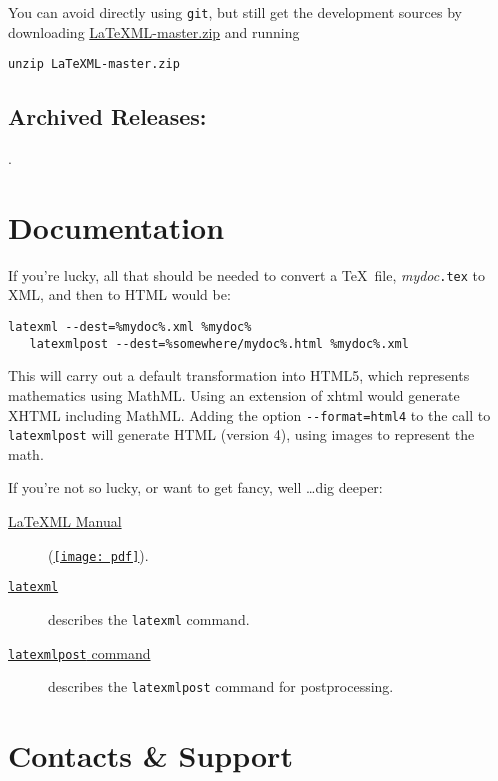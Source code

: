 \documentclass{article}
\newcommand{\PDFIcon}{\texttt{[image: pdf]}}
\begin{document}
You can avoid directly using \texttt{git}, but still get the development sources
by downloading
\href{https://github.com/brucemiller/LaTeXML/archive/master.zip}{LaTeXML-master.zip}
and running
\begin{lstlisting}[style=shell]
unzip LaTeXML-master.zip
\end{lstlisting}

\subsection{Archived Releases:}\label{archive}
\AllReleases.

\section{Documentation}\label{docs}
If you're lucky, all that should be needed to convert
a \TeX\ file, \textit{mydoc}\texttt{.tex} to XML, and
then to HTML would be:
\begin{lstlisting}[style=shell]
   latexml --dest=%mydoc%.xml %mydoc%
   latexmlpost --dest=%somewhere/mydoc%.html %mydoc%.xml
\end{lstlisting}
This will carry out a default transformation into HTML5,
which represents mathematics using MathML.  Using an
extension of xhtml would generate XHTML including MathML.
Adding the option \verb|--format=html4| to the call to \verb|latexmlpost|
will generate HTML (version 4), using images to represent the math.

If you're not so lucky, or want to get fancy, well \ldots dig deeper:
\begin{description}
\item[\href{manual/}{LaTeXML Manual}] (\href{manual.pdf}{\PDFIcon}).
\item[\href{manual/commands/latexml.html}{\texttt{latexml}}]
    describes the \texttt{latexml} command.
\item[\href{manual/commands/latexmlpost.html}{\texttt{latexmlpost} command}]
   describes the \texttt{latexmlpost} command for postprocessing.
\end{description}


\section{Contacts \& Support}\label{contact}
\end{document}
